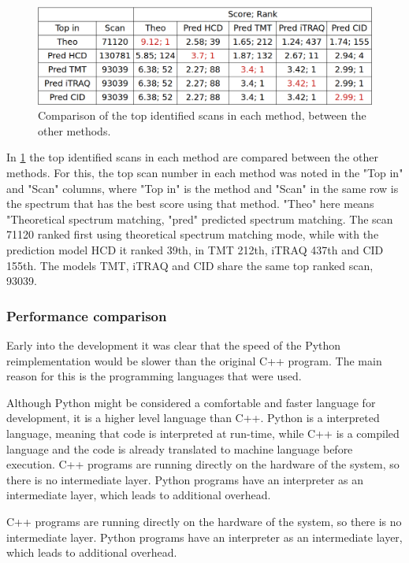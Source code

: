 \documentclass[11pt]{article}
\begin{document}
\begin{figure}[ht]
\centering
\includegraphics[width=1\textwidth]{figs/ident-comparison.png}
\caption{Comparison of the top identified scans in each method, between the other methods.}
\label{fig:ident-comparison}
\end{figure}

In \cref{fig:ident-comparison} the top identified scans in each method are compared between the other methods. For this, the top scan number in each method was noted in the "Top in" and "Scan" columns, where "Top in" is the method and "Scan" in the same row is the spectrum that has the best score using that method. "Theo" here means "Theoretical spectrum matching, "pred" predicted spectrum matching. 
The scan 71120 ranked first using theoretical spectrum matching mode, while with the prediction model HCD it ranked 39th, in TMT 212th, iTRAQ 437th and CID 155th. The models TMT, iTRAQ and CID share the same top ranked scan, 93039.

\subsubsection{Performance comparison}
Early into the development it was clear that the speed of the Python reimplementation would be slower than the original C++ program. The main reason for this is the programming languages that were used. 

Although Python might be considered a comfortable and faster language for development, it is a higher level language than C++. Python is a interpreted language, meaning that code is interpreted at run-time, while C++ is a compiled language and the code is already translated to machine language before execution. C++ programs are running directly on the hardware of the system, so there is no intermediate layer. Python programs have an interpreter as an intermediate layer, which leads to additional overhead.

C++ programs are running directly on the hardware of the system, so there is no intermediate layer. Python programs have an interpreter as an intermediate layer, which leads to additional overhead.
\end{document}
